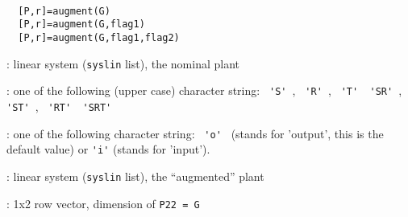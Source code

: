 %
% 
%
\begin{mandesc}
   \\ %
\end{mandesc}
\begin{calling_sequence}
\begin{verbatim}
  [P,r]=augment(G)  
  [P,r]=augment(G,flag1)  
  [P,r]=augment(G,flag1,flag2)  
\end{verbatim}
\end{calling_sequence}
\begin{parameters}
  \begin{varlist}
    : linear system (\verb!syslin! list), the nominal plant
    
    : one of the following (upper case) character string:
    \verb! 'S' !, \verb! 'R' !, \verb! 'T' !\verb! 'SR' !, \verb! 'ST' !,
    \verb! 'RT' !\verb! 'SRT' !
    
    : one of the following character string: \verb! 'o' ! (stands
    for 'output', this is the default value) or \verb!'i'! (stands for 'input').
    
    : linear system (\verb!syslin! list), the ``augmented'' plant
    
    : 1x2 row vector, dimension of \verb!P22 = G!
  \end{varlist}
\end{parameters}
